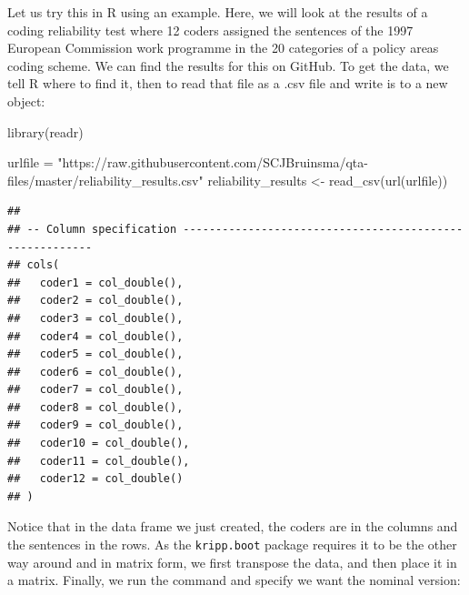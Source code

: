 \documentclass[
]{book}
\newenvironment{Shaded}{\begin{snugshade}}{\end{snugshade}}
\newcommand{\AttributeTok}[1]{\textcolor[rgb]{0.77,0.63,0.00}{#1}}
\newcommand{\DecValTok}[1]{\textcolor[rgb]{0.00,0.00,0.81}{#1}}
\newcommand{\FunctionTok}[1]{\textcolor[rgb]{0.00,0.00,0.00}{#1}}
\newcommand{\NormalTok}[1]{#1}
\newcommand{\OtherTok}[1]{\textcolor[rgb]{0.56,0.35,0.01}{#1}}
\newcommand{\SpecialCharTok}[1]{\textcolor[rgb]{0.00,0.00,0.00}{#1}}
\newcommand{\StringTok}[1]{\textcolor[rgb]{0.31,0.60,0.02}{#1}}
\begin{document}
Let us try this in R using an example. Here, we will look at the results of a coding reliability test where 12 coders assigned the sentences of the 1997 European Commission work programme in the 20 categories of a policy areas coding scheme. We can find the results for this on GitHub. To get the data, we tell R where to find it, then to read that file as a .csv file and write is to a new object:

\begin{Shaded}
\begin{Highlighting}[]
\FunctionTok{library}\NormalTok{(readr)}

\NormalTok{urlfile }\OtherTok{=} \StringTok{"https://raw.githubusercontent.com/SCJBruinsma/qta{-}files/master/reliability\_results.csv"}
\NormalTok{reliability\_results }\OtherTok{\textless{}{-}} \FunctionTok{read\_csv}\NormalTok{(}\FunctionTok{url}\NormalTok{(urlfile))}
\end{Highlighting}
\end{Shaded}

\begin{verbatim}
## 
## -- Column specification --------------------------------------------------------
## cols(
##   coder1 = col_double(),
##   coder2 = col_double(),
##   coder3 = col_double(),
##   coder4 = col_double(),
##   coder5 = col_double(),
##   coder6 = col_double(),
##   coder7 = col_double(),
##   coder8 = col_double(),
##   coder9 = col_double(),
##   coder10 = col_double(),
##   coder11 = col_double(),
##   coder12 = col_double()
## )
\end{verbatim}

Notice that in the data frame we just created, the coders are in the columns and the sentences in the rows. As the \texttt{kripp.boot} package requires it to be the other way around and in matrix form, we first transpose the data, and then place it in a matrix. Finally, we run the command and specify we want the nominal version:

\begin{Shaded}
\end{Shaded}
\end{document}
